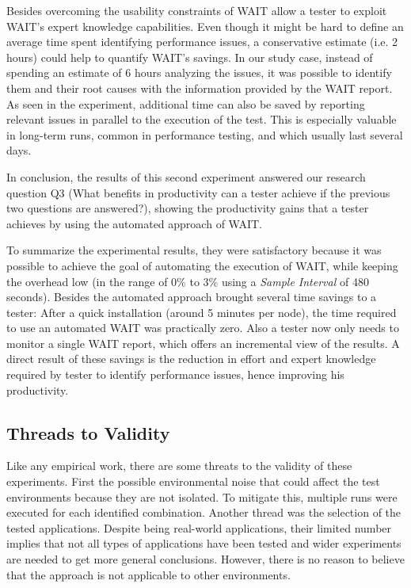 \documentclass[runningheads,a4paper]{llncs}
\begin{document}
Besides overcoming the usability constraints of WAIT allow a tester to exploit
WAIT's expert knowledge capabilities. Even though it might be hard to define an
average time spent identifying performance issues, a conservative estimate (i.e.
2 hours) could help to quantify WAIT's savings. In our study case, instead of
spending an estimate of 6 hours analyzing the issues, it was possible to
identify them and their root causes with the information provided by the WAIT
report. As seen in the experiment, additional time can also be saved by
reporting relevant issues in parallel to the execution of the test. This is 
especially valuable in long-term runs, common in performance testing, and
which usually last several days.

In conclusion, the results of this second experiment answered our research
question Q3 (What benefits in productivity can a tester achieve if the previous
two questions are answered?), showing the productivity gains that a tester
achieves by using the automated approach of WAIT.

To summarize the experimental results, they were satisfactory because it
was possible to achieve the goal of automating the execution of WAIT,
while keeping the overhead low (in the range of 0\% to 3\% using a \emph{Sample
Interval} of 480 seconds). Besides the automated approach brought several time
savings to a tester: After a quick installation (around 5 minutes per node), the
time required to use an automated WAIT was practically zero. Also a tester
now only needs to monitor a single WAIT report, which offers an incremental view
of the results. A direct result of these savings is the reduction in effort and
expert knowledge required by tester to identify performance issues, hence
improving his productivity.

\vspace{-5pt}
\subsection{Threads to Validity}
\vspace{-5pt}
Like any empirical work, there are some threats to the validity of these
experiments. First the possible environmental noise that could affect the test
environments because they are not isolated. To mitigate this, multiple runs were
executed for each identified combination. Another thread was the selection of
the tested applications. Despite being real-world applications, their limited
number implies that not all types of applications have been tested and wider
experiments are needed to get more general conclusions. However, there is no
reason to believe that the approach is not applicable to other environments.
\end{document}
